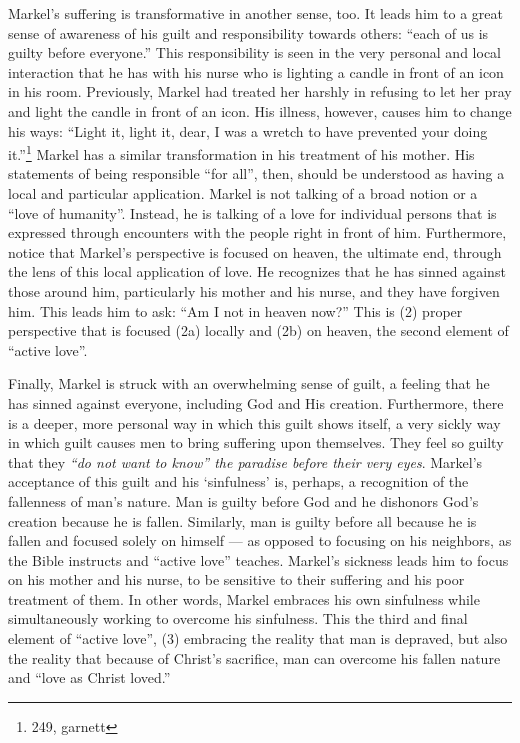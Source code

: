     Markel's suffering is transformative in another sense, too. It leads him to a great sense of awareness of his guilt and responsibility towards others: ``each of us is guilty before everyone.'' This responsibility is seen in the very personal and local interaction that he has with his nurse who is lighting a candle in front of an icon in his room. Previously, Markel had treated her harshly in refusing to let her pray and light the candle in front of an icon. His illness, however, causes him to change his ways: ``Light it, light it, dear, I was a wretch to have prevented your doing it.''\footnote{249, garnett} Markel has a similar transformation in his treatment of his mother. His statements of being responsible ``for all'', then, should be understood as having a local and particular application. Markel is not talking of a broad notion or a ``love of humanity''. Instead, he is talking of a love for individual persons that is expressed through encounters with the people right in front of him. Furthermore, notice that Markel's perspective is focused on heaven, the ultimate end, through the lens of this local application of love. He recognizes that he has sinned against those around him, particularly his mother and his nurse, and they have forgiven him. This leads him to ask: ``Am I not in heaven now?'' This is (2) proper perspective that is focused (2a) locally and (2b) on heaven, the second element of ``active love''.
    
    Finally, Markel is struck with an overwhelming sense of guilt, a feeling that he has sinned against everyone, including God and His creation. Furthermore, there is a deeper, more personal way in which this guilt shows itself, a very sickly way in which guilt causes men to bring suffering upon themselves. They feel so guilty that they \emph{``do not want to know'' the paradise before their very eyes}. Markel's acceptance of this guilt and his `sinfulness' is, perhaps, a recognition of the fallenness of man's nature. Man is guilty before God and he dishonors God's creation because he is fallen. Similarly, man is guilty before all because he is fallen and focused solely on himself --- as opposed to focusing on his neighbors, as the Bible instructs and ``active love'' teaches. Markel's sickness leads him to focus on his mother and his nurse, to be sensitive to their suffering and his poor treatment of them. In other words, Markel embraces his own sinfulness while simultaneously working to overcome his sinfulness. This the third and final element of ``active love'', (3) embracing the reality that man is depraved, but also the reality that because of Christ's sacrifice, man can overcome his fallen nature and ``love as Christ loved.''
    
